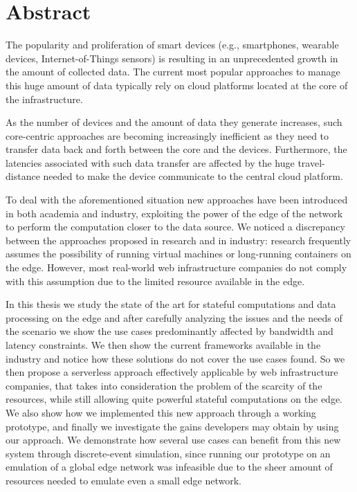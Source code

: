 \chapter*{Abstract}

The popularity and proliferation of smart devices (e.g., smartphones, wearable devices, Internet-of-Things sensors) is resulting in an unprecedented growth in the amount of collected data. The current most popular approaches to manage this huge amount of data typically rely on cloud platforms located at the core of the infrastructure.

As the number of devices and the amount of data they generate increases, such core-centric approaches are becoming increasingly inefficient as they need to transfer data back and forth between the core and the devices. Furthermore, the latencies associated with such data transfer are affected by the huge travel-distance needed to make the device communicate to the central cloud platform.

To deal with the aforementioned situation new approaches have been introduced in both academia and industry, exploiting the power of the edge of the network to perform the computation closer to the data source. We noticed a discrepancy between the approaches proposed in research and in industry: research frequently assumes the possibility of running virtual machines or long-running containers on the edge. However, most real-world web infrastructure companies do not comply with this assumption due to the limited resource available in the edge.

In this thesis we study the state of the art for stateful computations and data processing on the edge and after carefully analyzing the issues and the needs of the scenario we show the use cases predominantly affected by bandwidth and latency constraints. We then show the current frameworks available in the industry and notice how these solutions do not cover the use cases found. So we then propose a serverless approach effectively applicable by web infrastructure companies, that takes into consideration the problem of the scarcity of the resources, while still allowing quite powerful stateful computations on the edge. We also show how we implemented this new approach through a working prototype, and finally we investigate the gains developers may obtain by using our approach. We demonstrate how several use cases can benefit from this new system through discrete-event simulation, since running our prototype on an emulation of a global edge network was infeasible due to the sheer amount of resources needed to emulate even a small edge network.

